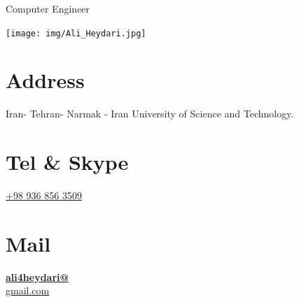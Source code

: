 \documentclass[a4paper]{friggeri-cv}
\begin{document}
      {Computer Engineer}


\begin{aside}
  \texttt{[image: img/Ali\_Heydari.jpg]}
  \section{Address}
Iran- Tehran- Narmak -
Iran University of Science and Technology.
    ~
  \section{Tel \& Skype}
   \href{tel:+989368563509}{+98 936 856 3509}
    ~
  \section{Mail}
 \href{mailto:ali4heydari@gmail.com}{\textbf{ali4heydari@}\\gmail.com}
    ~

\end{aside}
\end{document}
